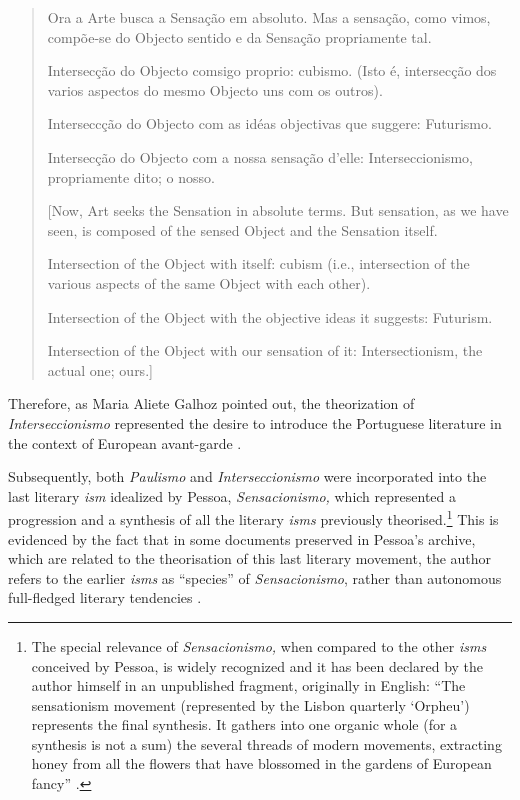 \documentclass{article}
\begin{document}
\begin{quote}
Ora a Arte busca a Sensação em absoluto. Mas a sensação, como vimos,
compõe-se do Objecto sentido e da Sensação propriamente tal.

Intersecção do Objecto comsigo proprio: cubismo. (Isto é, intersecção dos
varios aspectos do mesmo Objecto uns com os outros).

Interseccção do Objecto com as idéas objectivas que suggere: Futurismo.

Intersecção do Objecto com a nossa sensação d'elle: Interseccionismo,
propriamente dito; o nosso.

\vspace{1em}

[Now, Art seeks the Sensation in absolute terms. But sensation, as we
have seen, is composed of the sensed Object and the Sensation itself.

Intersection of the Object with itself: cubism (i.e., intersection of
the various aspects of the same Object with each other).

Intersection of the Object with the objective ideas it suggests:
Futurism.

Intersection of the Object with our sensation of it: Intersectionism,
the actual one; ours.]  

\begin{flushright}
    \parencite[122]{pessoa_sensacionismo_2009}
\end{flushright}
\end{quote}


\noindent Therefore, as Maria Aliete Galhoz pointed out, the theorization of
\emph{Interseccionismo} represented the desire to introduce the
Portuguese literature in the context of European avant-garde \parencite[XLI]{galhoz_o_1980}.

Subsequently, both \emph{Paulismo} and \emph{Interseccionismo} were
incorporated into the last literary \emph{ism} idealized by Pessoa,
\emph{Sensacionismo,} which represented a progression and a synthesis of
all the literary \emph{isms} previously theorised.\footnote{The special
  relevance of \emph{Sensacionismo,} when compared to the other
  \emph{isms} conceived by Pessoa, is widely recognized and it has been
  declared by the author himself in an unpublished fragment, originally
  in English: ``The sensationism movement (represented by the Lisbon
  quarterly `Orpheu') represents the final synthesis. It gathers into
  one organic whole (for a synthesis is not a sum) the several threads
  of modern movements, extracting honey from all the flowers that have
  blossomed in the gardens of European fancy'' \parencite[159]{pessoa_sensacionismo_2009}.} This
is evidenced by the fact that in some documents preserved in Pessoa's
archive, which are related to the theorisation of this last literary
movement, the author refers to the earlier \emph{isms} as ``species'' of
\emph{Sensacionismo}, rather than autonomous full-fledged literary
tendencies \parencite[149]{pessoa_sensacionismo_2009}.
\end{document}
